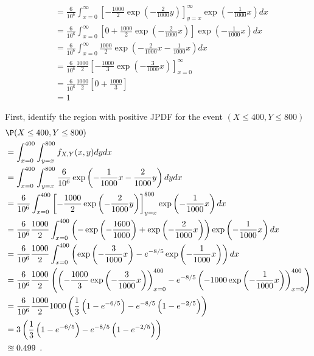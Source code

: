 \begin{example}
{\begin{align*}
&= \frac{6}{10^6} \int_{x=0}^{\infty} \left[ -\frac{1000}{2} \exp \left( -\frac{2}{1000}y \right) \right]_{y=x}^{\infty}  \exp \left(-\frac{1}{1000}x\right) dx\\
&= \frac{6}{10^6} \int_{x=0}^{\infty} \left[0 +\frac{1000}{2}\exp \left( -\frac{2}{1000}x \right) \right]  \exp \left(-\frac{1}{1000}x\right) dx\\
&= \frac{6}{10^6} \int_{x=0}^{\infty} \frac{1000}{2}\exp \left( -\frac{2}{1000}x -\frac{1}{1000}x\right) dx\\
&= \frac{6}{10^6} \frac{1000}{2} \left[ -\frac{1000}{3} \exp \left(-\frac{3}{1000}x\right)\right]_{x=0}^{\infty} \\
&= \frac{6}{10^6} \frac{1000}{2} \left[0 +\frac{1000}{3} \right] \\
&=1
\end{align*}
}
\item
First, identify the region with positive JPDF for the event $(X \leq 400, Y \leq 800)$
{\scriptsize
\begin{align*}
&\P(X \leq 400, Y \leq 800)\\
&= \int_{x=0}^{400} \int_{y=x}^{800} f_{X,Y}(x,y) dy dx \\
&= \int_{x=0}^{400} \int_{y=x}^{800} \frac{6}{10^6} \exp \left( -\frac{1}{1000}x-\frac{2}{1000}y \right) dy dx \\
&= \frac{6}{10^6}  \int_{x=0}^{400} \left[ -\frac{1000}{2} \exp \left( -\frac{2}{1000}y \right) \right]_{y=x}^{800}  \exp \left(-\frac{1}{1000}x\right) dx\\
&= \frac{6}{10^6} \frac{1000}{2} \int_{x=0}^{400} \left( - \exp \left( -\frac{1600}{1000} \right) + \exp \left( -\frac{2}{1000}x \right) \right)  \exp \left(-\frac{1}{1000}x\right) dx\\
&= \frac{6}{10^6} \frac{1000}{2} \int_{x=0}^{400} \left( \exp \left( -\frac{3}{1000}x \right) - e^{-8/5} \exp \left(-\frac{1}{1000}x\right)\right) dx\\
&= \frac{6}{10^6} \frac{1000}{2} \left( \left( -\frac{1000}{3} \exp \left( -\frac{3}{1000}x \right) \right)_{x=0}^{400} - e^{-8/5} \left(-1000 \exp \left(-\frac{1}{1000}x\right)\right)_{x=0}^{400} \right) \\
&= \frac{6}{10^6} \frac{1000}{2} 1000 \left( \frac{1}{3}\left(1- e^{-6/5} \right) - e^{-8/5} \left( 1-e^{-2/5}\right) \right) \\
&= 3 \left( \frac{1}{3}\left(1- e^{-6/5} \right) - e^{-8/5} \left( 1-e^{-2/5}\right) \right) \\
&\approxeq 0.499 \enspace .
\end{align*}
}
\end{example}
